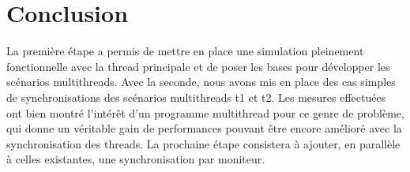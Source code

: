 \documentclass[11pt]{article} %
\begin{document}
\newpage


\section{Conclusion}
La première étape a permis de mettre en place une simulation pleinement fonctionnelle avec la thread principale et de poser les bases pour développer les scénarios multithreads. Avec la seconde, nous avons mis en place des cas simples de synchronisations des scénarios multithreads t1 et t2.
Les mesures effectuées ont bien montré l'intérêt d'un programme multithread pour ce genre de problème, qui donne un véritable gain de performances pouvant être encore amélioré avec la synchronisation des threads. La prochaine étape consistera à ajouter, en parallèle à celles existantes, une synchronisation par moniteur.
\end{document}
